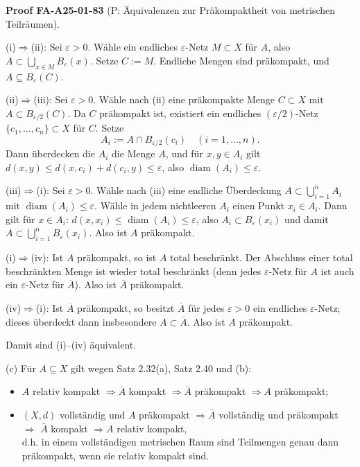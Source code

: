 \documentclass[10pt, letterpaper]{article}
\newcommand{\CustomHeading}[3]{%
  \par\medskip\noindent%
  \textbf{#1 #2} \textnormal{(#3)}.\enskip%
}
\newenvironment{PROOF}[2]{\begin{unitbox}\CustomHeading{Proof}{#1}{#2}}{\end{unitbox}}
\begin{document}
\begin{PROOF}{FA-A25-01-83}{P: Äquivalenzen zur Präkompaktheit von metrischen Teilräumen}
\noindent (i)$\Rightarrow$(ii): Sei $\varepsilon>0$. Wähle ein endliches $\varepsilon$-Netz $M\subset X$ für $A$, also
$A\subset \bigcup_{x\in M} B_\varepsilon(x)$. Setze $C:=M$. Endliche Mengen sind präkompakt, und
$A\subseteq B_\varepsilon(C)$.

\smallskip
\noindent (ii)$\Rightarrow$(iii): Sei $\varepsilon>0$. Wähle nach (ii) eine präkompakte Menge $C\subset X$ mit
$A\subset B_{\varepsilon/2}(C)$. Da $C$ präkompakt ist, existiert ein endliches $(\varepsilon/2)$-Netz
$\{c_1,\dots,c_n\}\subset X$ für $C$. Setze
\[
A_i:=A\cap B_{\varepsilon/2}(c_i)\quad (i=1,\dots,n).
\]
Dann überdecken die $A_i$ die Menge $A$, und für $x,y\in A_i$ gilt
$d(x,y)\le d(x,c_i)+d(c_i,y)\le \varepsilon$, also $\operatorname{diam}(A_i)\le \varepsilon$.

\smallskip
\noindent (iii)$\Rightarrow$(i): Sei $\varepsilon>0$. Wähle nach (iii) eine endliche Überdeckung $A\subset\bigcup_{i=1}^n A_i$
mit $\operatorname{diam}(A_i)\le \varepsilon$. Wähle in jedem nichtleeren $A_i$ einen Punkt $x_i\in A_i$.
Dann gilt für $x\in A_i$: $d(x,x_i)\le \operatorname{diam}(A_i)\le \varepsilon$, also
$A_i\subset B_\varepsilon(x_i)$ und damit $A\subset \bigcup_{i=1}^n B_\varepsilon(x_i)$. Also ist $A$ präkompakt.

\smallskip
\noindent (i)$\Rightarrow$(iv): Ist $A$ präkompakt, so ist $A$ total beschränkt. Der Abschluss einer total
beschränkten Menge ist wieder total beschränkt (denn jedes $\varepsilon$-Netz für $A$ ist auch
ein $\varepsilon$-Netz für $\overline{A}$). Also ist $\overline{A}$ präkompakt.

\smallskip
\noindent (iv)$\Rightarrow$(i): Ist $\overline{A}$ präkompakt, so besitzt $\overline{A}$ für jedes $\varepsilon>0$ ein endliches
$\varepsilon$-Netz; dieses überdeckt dann insbesondere $A\subset \overline{A}$. Also ist $A$ präkompakt.

\smallskip
Damit sind (i)–(iv) äquivalent.
\end{PROOF}


(c) Für $A \subseteq X$ gilt wegen Satz 2.32(a), Satz 2.40 und (b):

\begin{itemize}
  \item $A$ relativ kompakt $\Longrightarrow \bar{A}$ kompakt $\Longrightarrow \bar{A}$ präkompakt $\Longrightarrow A$ präkompakt;
  \item $(X, d)$ vollständig und $A$ präkompakt $\Longrightarrow \bar{A}$ vollständig und präkompakt $\Longrightarrow$ $\bar{A}$ kompakt $\Longrightarrow A$ relativ kompakt,\\
d.h. in einem vollständigen metrischen Raum sind Teilmengen genau dann präkompakt, wenn sie relativ kompakt sind.\\
\end{itemize}
\end{document}
